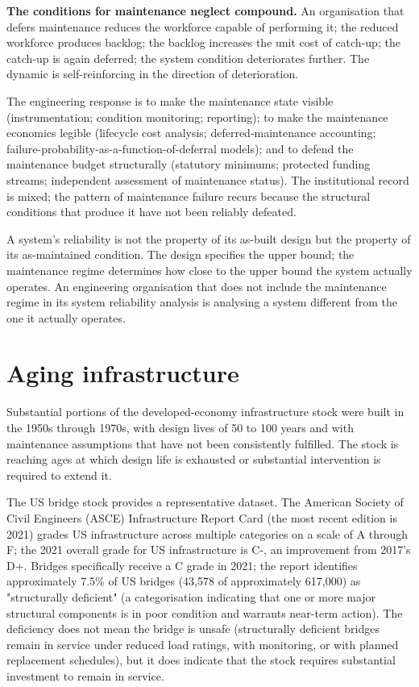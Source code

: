 \textbf{The conditions for maintenance neglect compound.} An organisation that defers maintenance reduces the workforce capable of performing it; the reduced workforce produces backlog; the backlog increases the unit cost of catch-up; the catch-up is again deferred; the system condition deteriorates further. The dynamic is self-reinforcing in the direction of deterioration.

The engineering response is to make the maintenance state visible (instrumentation; condition monitoring; reporting); to make the maintenance economics legible (lifecycle cost analysis; deferred-maintenance accounting; failure-probability-as-a-function-of-deferral models); and to defend the maintenance budget structurally (statutory minimums; protected funding streams; independent assessment of maintenance status). The institutional record is mixed; the pattern of maintenance failure recurs because the structural conditions that produce it have not been reliably defeated.

\begin{principle}
A system's reliability is not the property of its as-built design but the property of its as-maintained condition. The design specifies the upper bound; the maintenance regime determines how close to the upper bound the system actually operates. An engineering organisation that does not include the maintenance regime in its system reliability analysis is analysing a system different from the one it actually operates.
\end{principle}

\section{Aging infrastructure}

Substantial portions of the developed-economy infrastructure stock were built in the 1950s through 1970s, with design lives of 50 to 100 years and with maintenance assumptions that have not been consistently fulfilled. The stock is reaching ages at which design life is exhausted or substantial intervention is required to extend it.

The US bridge stock provides a representative dataset. The American Society of Civil Engineers (ASCE) Infrastructure Report Card (the most recent edition is 2021) grades US infrastructure across multiple categories on a scale of A through F; the 2021 overall grade for US infrastructure is C-, an improvement from 2017's D+. Bridges specifically receive a C grade in 2021; the report identifies approximately 7.5\% of US bridges (43,578 of approximately 617,000) as "structurally deficient" (a categorisation indicating that one or more major structural components is in poor condition and warrants near-term action). The deficiency does not mean the bridge is unsafe (structurally deficient bridges remain in service under reduced load ratings, with monitoring, or with planned replacement schedules), but it does indicate that the stock requires substantial investment to remain in service.

